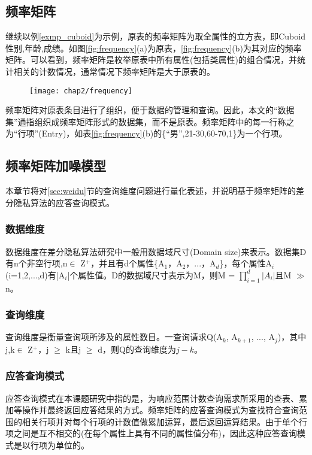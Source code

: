 \subsection{频率矩阵}

继续以例\ref{exmp_cuboid}为示例，原表的频率矩阵为取全属性的立方表，即Cuboid{性别,年龄,成绩}。如图\ref{fig:frequency}(a)为原表，\ref{fig:frequency}(b)为其对应的频率矩阵。可以看到，频率矩阵是枚举原表中所有属性(包括类属性)的组合情况，并统计相关的计数情况，通常情况下频率矩阵是大于原表的。

\begin{figure}[!htp]
	\centering
	\texttt{[image: chap2/frequency]}
\end{figure}

频率矩阵对原表条目进行了组织，便于数据的管理和查询。因此，本文的“数据集”通指组织成频率矩阵形式的数据集，而不是原表。频率矩阵中的每一行称之为“行项”(Entry)，如表\ref{fig:frequency}(b)的\{“男”,21-30,60-70,1\}为一个行项。

\subsection{频率矩阵加噪模型}

本章节将对\ref{sec:weidu}节的查询维度问题进行量化表述，并说明基于频率矩阵的差分隐私算法的应答查询模式。

\subsubsection{数据维度}
数据维度在差分隐私算法研究中一般用数据域尺寸(Domain size)来表示。数据集D有n个非空行项,n$\in$ Z$^{+}$，并且有d个属性\{A$_{1}$，A$_{2}$，...，A$_{d}$\}，每个属性A$_{i}$(i=1,2,...,d)有|A$_{i}$|个属性值。D的数据域尺寸表示为M，则M = \(\prod\limits_{i = 1}^d {|A{_i} |}\)且M $\gg$ n。

\subsubsection{查询维度}
查询维度是衡量查询项所涉及的属性数目。一查询请求Q(A$_{k}$, A$_{k+1}$, ..., A$_{j}$)，其中j,k$\in$ Z$^{+}$，j $\geqslant$ k且j $\geqslant$ d，则Q的查询维度为$j-k$。

\subsubsection{应答查询模式}
应答查询模式在本课题研究中指的是，为响应范围计数查询需求所采用的查表、累加等操作并最终返回应答结果的方式。频率矩阵的应答查询模式为查找符合查询范围的相关行项并对每个行项的计数值做累加运算，最后返回运算结果。由于单个行项之间是互不相交的(在每个属性上具有不同的属性值分布)，因此这种应答查询模式是以行项为单位的。

